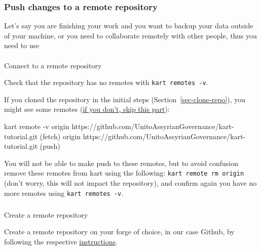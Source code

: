 \documentclass[
  letterpaper,
  DIV=11,
  numbers=noendperiod]{scrartcl}
\makeatletter
\let\oldparagraph\paragraph
\renewcommand{\paragraph}{
    \@ifstar
      \xxxParagraphStar
      \xxxParagraphNoStar
  }
\newcommand{\xxxParagraphStar}[1]{\oldparagraph*{#1}\mbox{}}
\newcommand{\xxxParagraphNoStar}[1]{\oldparagraph{#1}\mbox{}}
\let\oldsubparagraph\subparagraph
\renewcommand{\subparagraph}{
    \@ifstar
      \xxxSubParagraphStar
      \xxxSubParagraphNoStar
  }
\newcommand{\xxxSubParagraphStar}[1]{\oldsubparagraph*{#1}\mbox{}}
\newcommand{\xxxSubParagraphNoStar}[1]{\oldsubparagraph{#1}\mbox{}}
\newenvironment{Shaded}{\begin{snugshade}}{\end{snugshade}}
\newcommand{\AttributeTok}[1]{\textcolor[rgb]{1.00,0.47,0.78}{#1}}
\newcommand{\ErrorTok}[1]{\textcolor[rgb]{1.00,0.33,0.33}{\underline{#1}}}
\newcommand{\ExtensionTok}[1]{\textcolor[rgb]{0.55,0.91,0.99}{#1}}
\newcommand{\KeywordTok}[1]{\textcolor[rgb]{1.00,0.47,0.78}{#1}}
\newcommand{\NormalTok}[1]{\textcolor[rgb]{0.97,0.97,0.95}{#1}}
\makeatother
\begin{document}
\subsubsection{Push changes to a remote
repository}\label{push-changes-to-a-remote-repository}

Let's say you are finishing your work and you want to backup your data
outside of your machine, or you need to collaborate remotely with other
people, thus you need to use

\paragraph{Connect to a remote
repository}\label{connect-to-a-remote-repository}

Check that the repository has no remotes with
\texttt{kart\ remotes\ -v}.

If you cloned the repository in the initial steps
(Section~\ref{sec-clone-repo}), you might see some remotes (\ul{if you
don't, skip this part}):

\begin{Shaded}
\begin{Highlighting}[]
\ExtensionTok{kart}\NormalTok{ remote }\AttributeTok{{-}v}
\ExtensionTok{origin}\NormalTok{  https://github.com/UnitoAssyrianGovernance/kart{-}tutorial.git }\ErrorTok{(}\ExtensionTok{fetch}\KeywordTok{)}
\ExtensionTok{origin}\NormalTok{  https://github.com/UnitoAssyrianGovernance/kart{-}tutorial.git }\ErrorTok{(}\ExtensionTok{push}\KeywordTok{)}
\end{Highlighting}
\end{Shaded}

You will not be able to make push to these remotes, but to avoid
confusion remove these remotes from kart using the following:
\texttt{kart\ remote\ rm\ origin} (don't worry, this will not impact the
repository), and confirm again you have no more remotes using
\texttt{kart\ remotes\ -v}.

\subparagraph{Create a remote
repository}\label{create-a-remote-repository}

Create a remote repository on your forge of choice, in our case Github,
by following the respective
\href{https://docs.github.com/en/repositories/creating-and-managing-repositories/creating-a-new-repository}{instructions}.
\end{document}
